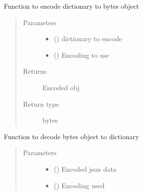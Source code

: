 \documentclass[letterpaper,10pt,english]{sphinxmanual}
\begin{document}
\begin{fulllineitems}
\begin{fulllineitems}
\label{\detokenize{Message:Message.Message._json_encode}}
Function to encode dictionary to bytes object
\begin{quote}\begin{description}
\item[{Parameters}] \leavevmode\begin{itemize}
\item {} 
 () \textendash{} dictionary to encode

\item {} 
 () \textendash{} Encoding to use

\end{itemize}

\item[{Returns}] \leavevmode
Encoded obj

\item[{Return type}] \leavevmode
bytes

\end{description}\end{quote}

\end{fulllineitems}


\begin{fulllineitems}
\label{\detokenize{Message:Message.Message._json_decode}}
Function to decode bytes object to dictionary
\begin{quote}\begin{description}
\item[{Parameters}] \leavevmode\begin{itemize}
\item {} 
 () \textendash{} Encoded json data

\item {} 
 () \textendash{} Encoding used


\end{itemize}
\end{description}
\end{quote}
\end{fulllineitems}
\end{fulllineitems}
\end{document}
